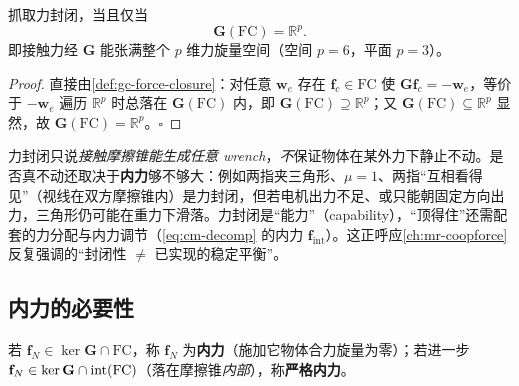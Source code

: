 \begin{proposition}[力封闭的像集判据]
\label{prop:gc-fc-image}
抓取力封闭，当且仅当
\begin{equation}
  \mathbf{G}(\mathrm{FC})=\mathbb{R}^p.
  \label{eq:gc-fc-image}
\end{equation}
即接触力经 $\mathbf{G}$ 能张满整个 $p$ 维力旋量空间（空间 $p=6$，平面 $p=3$）。
\end{proposition}
\begin{proof}
直接由\cref{def:gc-force-closure}：对任意 $\mathbf{w}_e$ 存在 $\mathbf{f}_c\in\mathrm{FC}$ 使 $\mathbf{G}\mathbf{f}_c=-\mathbf{w}_e$，等价于 $-\mathbf{w}_e$ 遍历 $\mathbb{R}^p$ 时总落在 $\mathbf{G}(\mathrm{FC})$ 内，即 $\mathbf{G}(\mathrm{FC})\supseteq\mathbb{R}^p$；又 $\mathbf{G}(\mathrm{FC})\subseteq\mathbb{R}^p$ 显然，故 $\mathbf{G}(\mathrm{FC})=\mathbb{R}^p$。$\square$
\end{proof}

\begin{note}
力封闭只说\emph{接触摩擦锥能生成任意 wrench}，\emph{不}保证物体在某外力下静止不动。是否真不动还取决于\textbf{内力}够不够大：例如两指夹三角形、$\mu=1$、两指“互相看得见”（视线在双方摩擦锥内）是力封闭，但若电机出力不足、或只能朝固定方向出力，三角形仍可能在重力下滑落\cite{lynch2017modern}。力封闭是“能力”（capability），“顶得住”还需配套的力分配与内力调节（\cref{eq:cm-decomp} 的内力 $\mathbf{f}_{\text{int}}$）。这正呼应\cref{ch:mr-coopforce} 反复强调的“封闭性 $\ne$ 已实现的稳定平衡”。
\end{note}

\subsection{内力的必要性}
\label{sec:gc-fc-internal}

\begin{definition}[内力与严格内力]
\label{def:gc-internal}
若 $\mathbf{f}_N\in\ker\mathbf{G}\cap\mathrm{FC}$，称 $\mathbf{f}_N$ 为\textbf{内力}（施加它物体合力旋量为零）；若进一步 $\mathbf{f}_N\in\ker\mathbf{G}\cap\operatorname{int}(\mathrm{FC})$（落在摩擦锥\emph{内部}），称\textbf{严格内力}。
\end{definition}


